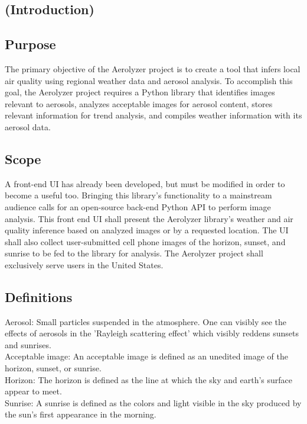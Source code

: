\documentclass[journal,10pt,draftclsnofoot,onecolumn]{IEEEtran}
\begin{document}
\begin{singlespace}

\section{(Introduction)}

\subsection{Purpose}
The primary objective of the Aerolyzer project is to create a tool that infers local air quality using regional weather data and aerosol analysis. To accomplish this goal, the Aerolyzer project requires a Python library that identifies images relevant to aerosols, analyzes acceptable images for aerosol content, stores relevant information for trend analysis, and compiles weather information with its aerosol data.

\subsection{Scope}
A front-end UI has already been developed, but must be modified in order to become a useful too. Bringing this library's functionality to a mainstream audience calls for an open-source back-end Python API to perform image analysis. This front end UI shall present the Aerolyzer library's weather and air quality inference based on analyzed images or by a requested location. The UI shall also collect user-submitted cell phone images of the horizon, sunset, and sunrise to be fed to the library for analysis. The Aerolyzer project shall exclusively serve users in the United States.

\subsection{Definitions}
Aerosol: Small particles suspended in the atmosphere. One can visibly see the effects of aerosols in the 'Rayleigh scattering effect' which visibly reddens sunsets and sunrises. \\

Acceptable image: An acceptable image is defined as an unedited image of the horizon, sunset, or sunrise.\\

Horizon: The horizon is defined as the line at which the sky and earth's surface appear to meet.\\

Sunrise: A sunrise is defined as the colors and light visible in the sky produced by the sun's first appearance in the morning.\\


\end{singlespace}
\end{document}
